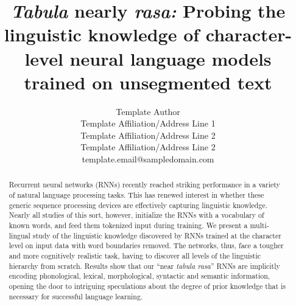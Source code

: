 \title{\emph{Tabula} nearly \emph{rasa:} Probing the linguistic knowledge of character-level neural language models trained on unsegmented text}


\author{
 Template Author \\
 Template Affiliation/Address Line 1 \\
 Template Affiliation/Address Line 2 \\
 Template Affiliation/Address Line 2 \\
  {\sf template.email@sampledomain.com} \\
}

\date{}


\maketitle
\begin{abstract}
Recurrent neural networks (RNNs) recently reached striking performance in a variety of natural language processing tasks. This has renewed interest in whether these generic sequence processing devices are effectively capturing linguistic knowledge. Nearly all studies of this sort, however, initialize the RNNs with a vocabulary of known words, and feed them tokenized input during training. We present a multi-lingual study of the linguistic knowledge discovered by RNNs trained at the character level on input data with word boundaries removed. The networks, thus, face a tougher and more cognitively realistic task, having to discover all levels of the linguistic hierarchy from scratch. Results show that our ``near \emph{tabula rasa}'' RNNs are implicitly encoding phonological, lexical, morphological, syntactic and semantic information, opening the door to intriguing speculations about the degree of prior knowledge that is necessary for successful language learning.
\end{abstract}










